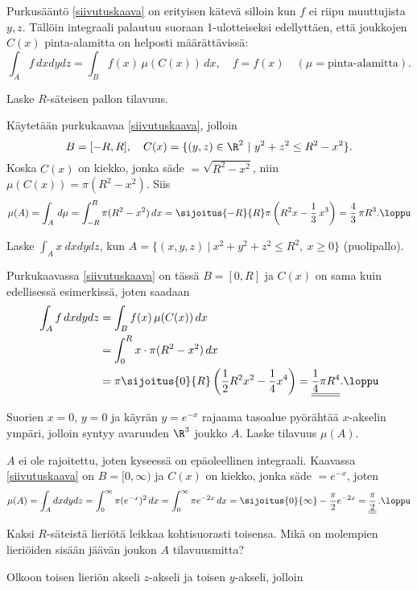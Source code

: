 Purkusääntö \eqref{siivutuskaava} on erityisen kätevä silloin kun $f$ ei riipu muuttujista
$y,z$. Tällöin integraali palautuu suoraan 1-ulotteiseksi edellyttäen, että joukkojen $C(x)$
pinta-alamitta on helposti määrättävissä:
\[
\int_A f\,dxdydz=\int_B f(x)\,\mu(C(x))\,dx,\quad f=f(x)\quad (\mu=\text{pinta-alamitta}).
\]
\begin{Exa} \label{3-pallon tilavuus} Laske $R$-säteisen pallon tilavuus.
\end{Exa}
\ratk Käytetään purkukaavaa \eqref{siivutuskaava}, jolloin 
\[ 
B=[-R,R], \quad C(x)=\{(y,z)\in\R^2 \ | \ y^2+z^2\leq R^2-x^2\}.
\]
Koska $C(x)$ on kiekko, jonka säde $=\sqrt{R^2-x^2}$, niin $\mu(C(x))=\pi(R^2-x^2)$.
Siis
\[
\mu(A) = \int_A\,d\mu = \int_{-R}^R \pi(R^2-x^2)\,dx 
                      = \sijoitus{-R}{R}\pi\left(R^2 x - \frac{1}{3}\,x^3\right)
                      = \frac{4}{3}\,\pi R^3. \loppu
\]
\begin{Exa} \label{puolipallon momentti} Laske $\int_A x\ dxdydz$, kun 
$A=\{(x,y,z) \ | \ x^2+y^2+z^2\leq R^2, \ x\geq 0\}$ (puolipallo).
\end{Exa}
\ratk Purkukaavassa \eqref{siivutuskaava} on tässä $B = [0,R]$ ja $C(x)$ on sama kuin
edellisessä esimerkissä, joten saadaan
\begin{align*}
\int_A f\,dxdydz &= \int_B f(x)\,\mu(C(x))\,dx \\
&=\int_0^R x\cdot\pi(R^2-x^2)\,dx \\
&=\pi\sijoitus{0}{R} \left(\frac{1}{2}R^2x^2-\frac{1}{4}x^4\right)
 =\underline{\underline{\frac{1}{4}\pi R^4}}. \loppu
\end{align*}
\begin{Exa}
Suorien $x=0$, $y=0$ ja käyrän $y=e^{-x}$ rajaama tasoalue pyörähtää $x$-akselin ympäri,
jolloin syntyy avaruuden $\R^3$ joukko $A$. Laske tilavuus $\mu(A)$.
\end{Exa} 
\ratk $A$ ei ole rajoitettu, joten kyseessä on epäoleellinen integraali. Kaavassa
\eqref{siivutuskaava} on $B=[0,\infty)$ ja $C(x)$ on kiekko, jonka säde $=e^{-x}$, joten
\[
\mu(A)=\int_A dxdydz = \int_0^\infty \pi(e^{-x})^2\,dx
                     = \int_0^\infty \pi e^{-2x}\,dx 
                     = \sijoitus{0}{\infty} -\frac{\pi}{2}e^{-2x} 
                     = \underline{\underline{\frac{\pi}{2}}}\,. \loppu
\]
\begin{Exa} Kaksi $R$-säteistä lieriötä leikkaa kohtisuorasti toisensa. Mikä on molempien
lieriöiden sisään jäävän joukon $A$ tilavuusmitta?
\end{Exa}
\ratk Olkoon toisen lieriön akseli $z$-akseli ja toisen $y$-akseli, jolloin
